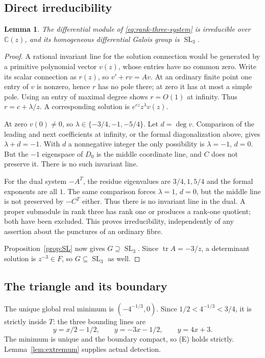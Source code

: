 \documentclass[11pt]{article}
\numberwithin{equation}{section}
\newtheorem{lemma}[lemma]{Lemma}
\theoremstyle{definition}
\theoremstyle{remark}
\newcommand{\C}{\mathbb C}
\newcommand{\SL}{\operatorname{SL}}
\begin{document}
\subsection{Direct irreducibility}
\begin{lemma}\label{lem:rank-three-irred}
The differential module of \eqref{eq:rank-three-system} is irreducible over
$\C(z)$, and its homogeneous differential Galois group is $\SL_3$.
\end{lemma}
\begin{proof}
A rational invariant line for the solution connection would be generated
by a primitive polynomial vector $v(z)$, whose entries have no common
zero. Write its scalar connection as $r(z)$, so
$v'+rv=Av$. At an ordinary finite point one entry of $v$ is nonzero, hence
$r$ has no pole there; at zero it has at most a simple pole. Using an entry
of maximal degree shows $r=O(1)$ at infinity. Thus $r=c+\lambda/z$.
A corresponding solution is $e^{cz}z^\lambda v(z)$.

At zero $v(0)\ne0$, so $\lambda\in\{-3/4,-1,-5/4\}$.
Let $d=\deg v$. Comparison of the leading and next coefficients at infinity,
or the formal diagonalization above, gives $\lambda+d=-1$.
With $d$ a nonnegative integer the only possibility is $\lambda=-1$, $d=0$.
But the $-1$ eigenspace of $D_0$ is the middle coordinate line, and $C$
does not preserve it. There is no such invariant line.

For the dual system $-A^T$, the residue eigenvalues are $3/4,1,5/4$ and
the formal exponents are all $1$. The same comparison forces
$\lambda=1$, $d=0$, but the middle line is not preserved by $-C^T$ either.
Thus there is no invariant line in the dual. A proper submodule in rank
three has rank one or produces a rank-one quotient; both have been excluded.
This proves irreducibility, independently of any assertion about the
punctures of an ordinary fibre.

Proposition~\ref{prop:SL} now gives $G\supseteq\SL_3$. Since
$\operatorname{tr}A=-3/z$, a determinant solution is $z^{-3}\in F$,
so $G\subseteq\SL_3$ as well.
\end{proof}

\subsection{The triangle and its boundary}
The unique global real minimum is $(-4^{-1/3},0)$.
Since $1/2<4^{-1/3}<3/4$, it is strictly inside $T$: the three bounding
lines are
\[
 y=x/2-1/2,\qquad y=-3x-1/2,\qquad y=4x+3.
\]
The minimum is unique and the boundary compact, so (E) holds strictly.
Lemma~\ref{lem:extremum} supplies actual detection.
\end{document}

